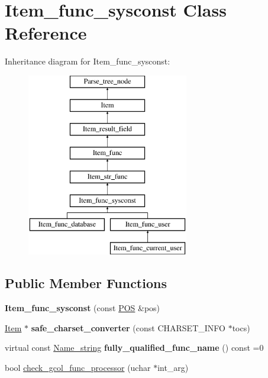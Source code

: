 \hypertarget{classItem__func__sysconst}{}\section{Item\+\_\+func\+\_\+sysconst Class Reference}
\label{classItem__func__sysconst}
Inheritance diagram for Item\+\_\+func\+\_\+sysconst\+:\begin{figure}[H]
\begin{center}
\leavevmode
\includegraphics[height=8.000000cm]{classItem__func__sysconst}
\end{center}
\end{figure}
\subsection*{Public Member Functions}
\begin{DoxyCompactItemize}
\item 
\mbox{\label{classItem__func__sysconst_a8eb8ad7c15106153a27234ad61f4d33a}} 
{\bfseries Item\+\_\+func\+\_\+sysconst} (const \mbox{\hyperlink{structYYLTYPE}{P\+OS}} \&pos)
\item 
\mbox{\label{classItem__func__sysconst_a8fafd09a9a64529c67f93303e8ab3405}} 
\mbox{\hyperlink{classItem}{Item}} $\ast$ {\bfseries safe\+\_\+charset\+\_\+converter} (const C\+H\+A\+R\+S\+E\+T\+\_\+\+I\+N\+FO $\ast$tocs)
\item 
\mbox{\label{classItem__func__sysconst_a7b514871c7ede86fea6b02b9a2a3bd23}} 
virtual const \mbox{\hyperlink{className__string}{Name\+\_\+string}} {\bfseries fully\+\_\+qualified\+\_\+func\+\_\+name} () const =0
\item 
bool \mbox{\hyperlink{classItem__func__sysconst_afef78b3a992b62b9c1155e0074e8ab72}{check\+\_\+gcol\+\_\+func\+\_\+processor}} (uchar $\ast$int\+\_\+arg)
\end{DoxyCompactItemize}
